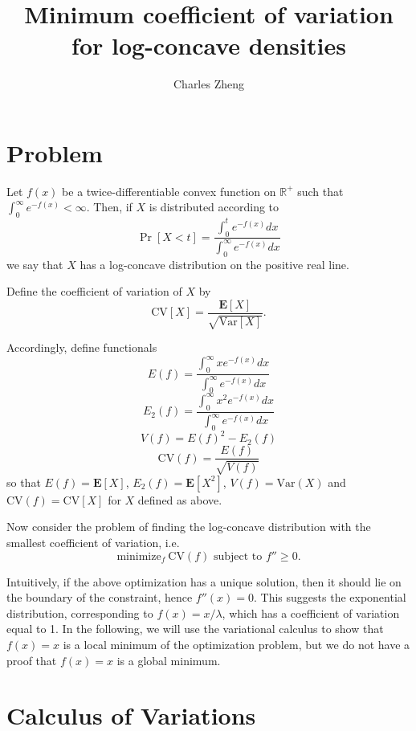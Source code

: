 \documentclass[11pt]{article}
\begin{document}
\newcommand{\tr}{\text{tr}}
\newcommand{\E}{\textbf{E}}
\newcommand{\diag}{\text{diag}}
\newcommand{\argmax}{\text{argmax}}
\newcommand{\argmin}{\text{argmin}}
\newcommand{\Cov}{\text{Cov}}
\newcommand{\Var}{\text{Var}}
\newcommand{\Vol}{\text{Vol}}
\newcommand{\HH}{\boldsymbol{H}}

\title{Minimum coefficient of variation for log-concave densities}

\author{Charles Zheng}


\maketitle

\section{Problem}

Let $f(x)$ be a twice-differentiable convex function on $\mathbb{R}^+$ such that $\int_0^\infty e^{-f(x)} < \infty$.
Then, if $X$ is distributed according to
\[
\Pr[X < t] = \frac{\int_0^t e^{-f(x)} dx}{\int_0^\infty e^{-f(x)} dx}
\]
we say that $X$ has a log-concave distribution on the positive real line.

Define the coefficient of variation of $X$ by
\[
\text{CV}[X] = \frac{\E[X]}{\sqrt{\Var[X]}}.
\]

Accordingly, define functionals
\[
E(f) = \frac{\int_0^\infty x e^{-f(x)} dx}{\int_0^\infty e^{-f(x)} dx}
\]
\[
E_2(f) = \frac{\int_0^\infty x^2 e^{-f(x)} dx}{\int_0^\infty e^{-f(x)} dx}
\]
\[
V(f) = E(f)^2 - E_2(f)
\]
\[
\text{CV}(f) = \frac{E(f)}{\sqrt{V(f)}}
\]
so that $E(f) = \E[X]$, $E_2(f) = \E[X^2]$, $V(f) = \Var(X)$ and $\text{CV}(f) = \text{CV}[X]$ for $X$ defined as above.

Now consider the problem of finding the log-concave distribution with the smallest coefficient of variation, i.e.
\[
\text{minimize}_f \ \text{CV}(f) \text{ subject to }f'' \geq 0.
\]

Intuitively, if the above optimization has a unique solution, then it
should lie on the boundary of the constraint, hence $f''(x) = 0$.
This suggests the exponential distribution, corresponding to $f(x) =
x/\lambda$, which has a coefficient of variation equal to 1.  In the
following, we will use the variational calculus to show that $f(x) =
x$ is a local minimum of the optimization problem, but we do not have
a proof that $f(x) = x$ is a global minimum.

\section{Calculus of Variations}
\end{document}
